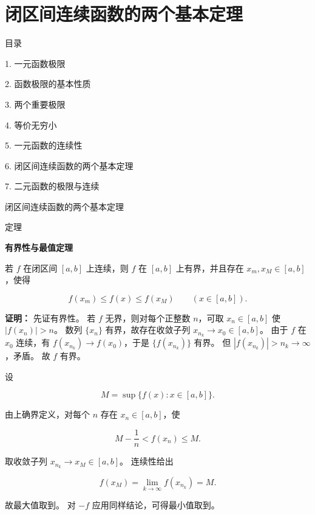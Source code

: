 \documentclass[aspectratio=169,10pt,fontset=fandol]{ctexbeamer}
\begin{document}
\section{闭区间连续函数的两个基本定理}
\begin{frame}[t,fragile]{目录}
\normalsize
{\color{black}\normalsize 1. 一元函数极限\par}\vspace{0.22em}
{\color{black}\normalsize 2. 函数极限的基本性质\par}\vspace{0.22em}
{\color{black}\normalsize 3. 两个重要极限\par}\vspace{0.22em}
{\color{black}\normalsize 4. 等价无穷小\par}\vspace{0.22em}
{\color{black}\normalsize 5. 一元函数的连续性\par}\vspace{0.22em}
{\color{blue}\normalsize 6. 闭区间连续函数的两个基本定理\par}\vspace{0.22em}
{\color{gray!40}\normalsize 7. 二元函数的极限与连续\par}\vspace{0.22em}
\end{frame}
\begin{frame}[t,fragile]{闭区间连续函数的两个基本定理}
\footnotesize
\begin{block}{定理}
{\footnotesize
\textbf{有界性与最值定理}\par


若 $f$ 在闭区间 $[a,b]$ 上连续，则 $f$ 在 $[a,b]$ 上有界，并且存在 $x_m,x_M\in[a,b]$，使得

\[

f(x_m)\le f(x)\le f(x_M)\qquad (x\in[a,b]).

\]


}
\end{block}
\pause
{\footnotesize
\textbf{证明：}
先证有界性。 若 $f$ 无界，则对每个正整数 $n$，可取 $x_n\in[a,b]$ 使 $|f(x_n)|>n$。 数列 $\{x_n\}$ 有界，故存在收敛子列 $x_{n_k}\to x_0\in[a,b]$。 由于 $f$ 在 $x_0$ 连续，有 $f(x_{n_k})\to f(x_0)$，于是 $\{f(x_{n_k})\}$ 有界。 但 $|f(x_{n_k})|>n_k\to\infty$，矛盾。 故 $f$ 有界。



设

\[

M=\sup\{f(x):x\in[a,b]\}.

\]

由上确界定义，对每个 $n$ 存在 $x_n\in[a,b]$，使

\[

M-\frac1n<f(x_n)\le M.

\]

取收敛子列 $x_{n_k}\to x_M\in[a,b]$。 连续性给出

\[

f(x_M)=\lim_{k\to\infty}f(x_{n_k})=M.

\]

故最大值取到。 对 $-f$ 应用同样结论，可得最小值取到。


}
\end{frame}
\end{document}
